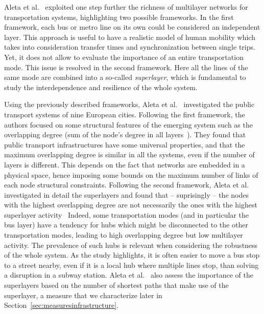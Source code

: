 Aleta et al.~\cite{Aleta2017Multilayer} exploited one step further the richness of multilayer networks for transportation systems, highlighting two possible frameworks. In the first framework, each bus or metro line on its own could be considered an independent layer. This approach is useful to have a realistic model of human mobility which takes into consideration transfer times and synchronization between single trips. Yet, it does not allow to evaluate the importance of an entire transportation mode. This issue is resolved in the second framework. Here all the lines of the same mode are combined into a so-called \textit{superlayer}, which is fundamental to study the interdependence and resilience of the whole system. 

Using the previously described frameworks, Aleta et al.~\cite{Aleta2017Multilayer} investigated the public transport systems of nine European cities. Following the first framework, the authors focused on some structural features of the emerging system such as the overlapping degree (sum of the node's degree in all layers~\cite{battiston2014structural}). They found that public transport infrastructures have some universal properties, and that the maximum overlapping degree is similar in all the systems, even if the number of layers is different. This depends on the fact that networks are embedded in a physical space, hence imposing some bounds on the maximum number of links of each node structural constraints. Following the second framework, Aleta et al.~\cite{Aleta2017Multilayer} investigated in detail the superlayers and found that -- suprisingly -- the nodes with the highest overlapping degree are not necessarily the ones with the highest superlayer activity~\cite{nicosia2015measuring} Indeed, some transportation modes (and in particular the bus layer) have a tendency for hubs which might be disconnected to the other transportation modes, leading to high overlapping degree but low multilayer activity. The prevalence of such hubs is relevant when considering the robustness of the whole system. As the study highlights, it is often easier to move a bus stop to a street nearby, even if it is a local hub where multiple lines stop, than solving a disruption in a subway station. Aleta et al.~\cite{Aleta2017Multilayer} also assess the importance of the superlayers based on the number of shortest paths that make use of the superlayer, a measure that we characterize later in Section~\ref{sec:measuresinfrastructure}.

